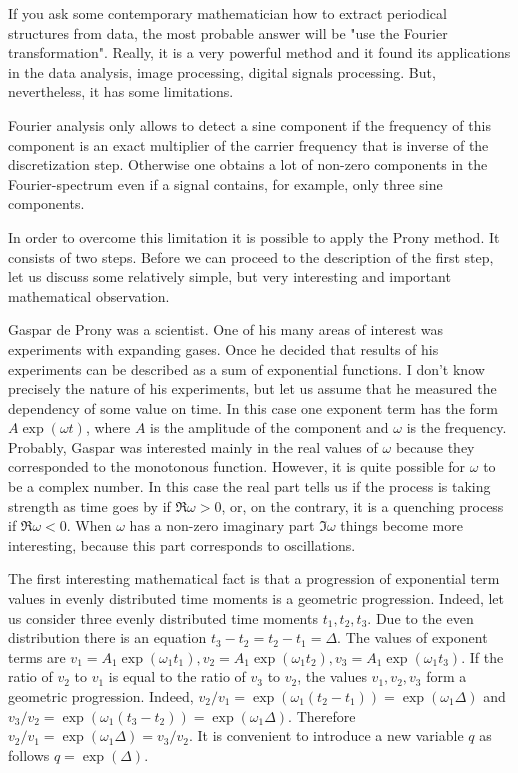 \documentclass[14pt]{extarticle}
\begin{document}
If you ask some contemporary mathematician how to extract
periodical structures from data, the most probable answer will
be "use the Fourier transformation". Really, it is a very
powerful method and it found its applications in the
data analysis, image processing, digital signals processing.
But, nevertheless, it has some limitations.

Fourier analysis only allows to detect a sine component if
the frequency of this component is an exact multiplier
of the carrier frequency that is inverse of the discretization
step. Otherwise one obtains a lot of non-zero components
in the Fourier-spectrum even if a signal contains, for example,
only three sine components.

In order to overcome this limitation it is possible to apply the
Prony method. It consists of two steps. Before we can proceed
to the description of the first step, let us discuss some relatively
simple, but very interesting and important mathematical observation.

Gaspar de Prony was a scientist. One of his many areas of interest was
experiments with expanding gases. Once he decided that results of his
experiments can be described as a sum of exponential functions. I don't
know precisely the nature of his experiments, but let us assume that he
measured the dependency of some value on time. In this case one exponent term
has the form $A\exp(\omega t)$, where $A$ is the amplitude of the component and
$\omega$ is the frequency. Probably, Gaspar was interested mainly in the real
values of $\omega$ because they corresponded to the monotonous function.
However, it is quite possible for $\omega$ to be a complex number. In this case
the real part tells us if the process is taking strength as time goes by if \(\Re \omega > 0\), or,
on the contrary, it is a quenching process if \(\Re \omega < 0\). When \(\omega\)
has a non-zero imaginary part $\Im \omega$ things become more interesting, because
this part corresponds to oscillations.

The first interesting mathematical fact is that a progression of exponential term values in evenly distributed time moments
is a geometric progression. 
%
Indeed, let us consider three evenly distributed time moments 
$t_1, t_2, t_3$. 
%
Due to the even distribution there is an equation $t_3 - t_2 = t_2 - t_1 = \Delta$.
The values of exponent terms are \(v_1 = A_1\exp(\omega_1 t_1), v_2 = A_1\exp(\omega_1 t_2), v_3 = A_1\exp(\omega_1 t_3)\).
If the ratio of \(v_2\) to \(v_1\) is equal to the ratio of \(v_3\) to \(v_2\), the values \(v_1, v_2, v_3\) form a geometric progression.
%
Indeed, \(v_2/v_1 = \exp(\omega_1(t_2 - t_1)) = \exp(\omega_1\Delta)\) and \(v_3/v_2 = \exp(\omega_1(t_3 - t_2)) = \exp(\omega_1\Delta)\).
%
Therefore \(v_2/v_1 = \exp(\omega_1\Delta) = v_3/v_2\).
%
It is convenient to introduce a
new variable \(q\) as follows \(q = \exp (\Delta)\).
\end{document}
